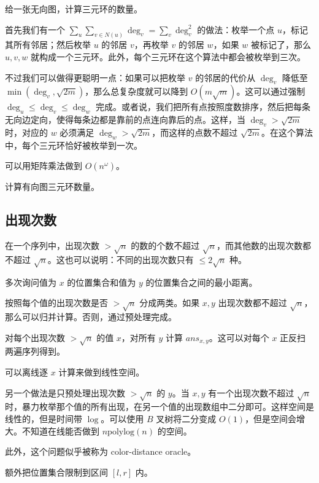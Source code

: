\begin{example}[三元环计数]
    给一张无向图，计算三元环的数量。
\end{example}
\begin{solution}
    首先我们有一个 $\sum_u\sum_{v\in N(u)}\deg_v=\sum_v \deg_v^2$ 的做法：枚举一个点 $u$，标记其所有邻居；然后枚举 $u$ 的邻居 $v$，再枚举 $v$ 的邻居 $w$，如果 $w$ 被标记了，那么 $u,v,w$ 就构成一个三元环。此外，每个三元环在这个算法中都会被枚举到三次。
    
    不过我们可以做得更聪明一点：如果可以把枚举 $v$ 的邻居的代价从 $\deg_v$ 降低至 $\min(\deg_v,\sqrt{2m})$，那么总复杂度就可以降到 $O(m\sqrt{m})$。这可以通过强制 $\deg_u\le \deg_v\le \deg_w$ 完成。或者说，我们把所有点按照度数排序，然后把每条无向边定向，使得每条边都是靠前的点连向靠后的点。这样，当 $\deg_v>\sqrt{2m}$ 时，对应的 $w$ 必须满足 $\deg_w>\sqrt{2m}$，而这样的点数不超过 $\sqrt{2m}$。在这个算法中，每个三元环恰好被枚举到一次。
\end{solution}
\begin{remark}
    可以用矩阵乘法做到 $O(n^\omega)$。
\end{remark}
\begin{exercise}
    计算有向图三元环数量。
\end{exercise}

\subsection{出现次数}

在一个序列中，出现次数 $> \sqrt{n}$ 的数的个数不超过 $\sqrt{n}$，而其他数的出现次数都不超过 $\sqrt{n}$。这也可以说明：不同的出现次数只有 $\le 2\sqrt{n}$ 种。

\begin{example}
    多次询问值为 $x$ 的位置集合和值为 $y$ 的位置集合之间的最小距离。    
\end{example}
\begin{solution}
    按照每个值的出现次数是否 $>\sqrt{n}$ 分成两类。如果 $x,y$ 出现次数都不超过 $\sqrt{n}$，那么可以归并计算。否则，通过预处理完成。

    对每个出现次数 $>\sqrt{n}$ 的值 $x$，对所有 $y$ 计算 $ans_{x,y}$。这可以对每个 $x$ 正反扫两遍序列得到。

    可以离线逐 $x$ 计算来做到线性空间。
\end{solution}
\begin{remark}
    另一个做法是只预处理出现次数 $>\sqrt{n}$ 的 $y$。当 $x,y$ 有一个出现次数不超过 $\sqrt{n}$ 时，暴力枚举那个值的所有出现，在另一个值的出现数组中二分即可。这样空间是线性的，但是时间带 $\log$。可以使用 $B$ 叉树将二分变成 $O(1)$，但是空间会增大。不知道在线能否做到 $n\mathrm{polylog}(n)$ 的空间。

    此外，这个问题似乎被称为 color-distance oracle。
\end{remark}
\begin{exercise}
    额外把位置集合限制到区间 $[l,r]$ 内。
\end{exercise}

